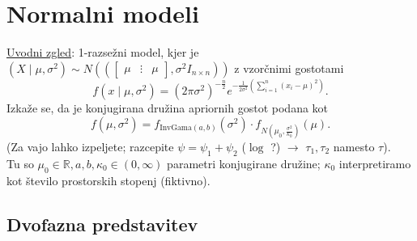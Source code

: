 \documentclass[a4paper, 12pt]{book}
\theoremstyle{definition}
\theoremstyle{remark}
\newcommand{\R}{\mathbb{R}}
\begin{document}

\chapter{Normalni modeli}


\underline{Uvodni zgled}: 1-razsežni  model, kjer je
$(X \mid \mu, \sigma^2) \sim N(\left(\begin{bmatrix}\mu & \vdots & \mu\end{bmatrix}, \sigma^2 I_{n \times n}\right))$
z vzorčnimi gostotami
\begin{equation}
  f(x \mid \mu, \sigma^2) = \left(2 \pi \sigma^2\right)^{-\frac{n}{2}} e^{-\frac{1}{2 \sigma^2} \left(\sum_{i=1}^{n} (x_i-\mu)^2\right)}.
  \label{normalni-gostota-x}
\end{equation}
Izkaže se, da je konjugirana družina apriornih gostot podana kot
\begin{equation}
  f(\mu, \sigma^2) = f_{\text{InvGama}(a,b)}(\sigma^2) \cdot f_{N\left(\mu_0, \frac{\sigma^2}{\kappa_0}\right)}(\mu).
  \label{normalni-apriorna}
\end{equation}
(Za vajo lahko izpeljete; razcepite $\psi = \psi_1 + \psi_2$ ($\log$ ?) $\to$ $\tau_1, \tau_2$ namesto $\tau$). \\
Tu so $\mu_0 \in \R, a, b, \kappa_0 \in (0, \infty)$ parametri konjugirane družine;
$\kappa_0$ interpretiramo kot število prostorskih stopenj (fiktivno).


\section{Dvofazna predstavitev}
\end{document}

